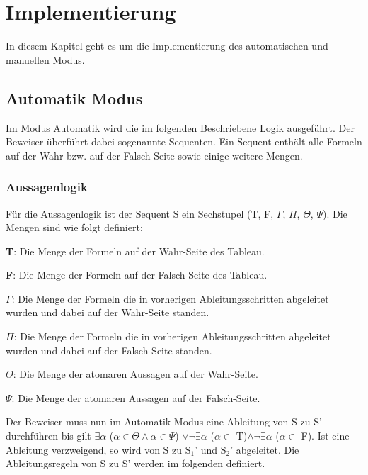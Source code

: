
\chapter{Implementierung}
In diesem Kapitel geht es um die Implementierung des automatischen und manuellen Modus.

\section{Automatik Modus}
Im Modus Automatik wird die im folgenden Beschriebene Logik ausgeführt. Der Beweiser überführt dabei sogenannte Sequenten. Ein Sequent enthält alle Formeln auf der Wahr bzw. auf der Falsch Seite sowie einige weitere Mengen.

\subsection{Aussagenlogik}
Für die Aussagenlogik ist der Sequent S ein Sechstupel (T, F, $\Gamma$, $\Pi$, $\Theta$, $\Psi$). Die Mengen sind wie folgt definiert:
\begin{description}
\item \textbf{T}: Die Menge der Formeln auf der Wahr-Seite des Tableau.

\item \textbf{F}: Die Menge der Formeln auf der Falsch-Seite des Tableau.

\item \textbf{$\Gamma$}: Die Menge der Formeln die in vorherigen Ableitungsschritten abgeleitet wurden und dabei auf der Wahr-Seite standen.

\item \textbf{$\Pi$}: Die Menge der Formeln die in vorherigen Ableitungsschritten abgeleitet wurden und dabei auf der Falsch-Seite standen.

\item \textbf{$\Theta$}: Die Menge der atomaren Aussagen auf der Wahr-Seite.

\item \textbf{$\Psi$}: Die Menge der atomaren Aussagen auf der Falsch-Seite.
\end{description}

Der Beweiser muss nun im Automatik Modus eine Ableitung von S zu S' durchführen bis gilt $\exists\alpha$ ($\alpha\in\Theta\wedge\alpha\in\Psi$) $\vee\neg\exists\alpha$ ($\alpha\in$ T)$\wedge\neg\exists\alpha$ ($\alpha\in$ F). Ist eine Ableitung verzweigend, so wird von S zu S$_{1}$' und S$_{2}$' abgeleitet. Die Ableitungsregeln von S zu S' werden im folgenden definiert.

